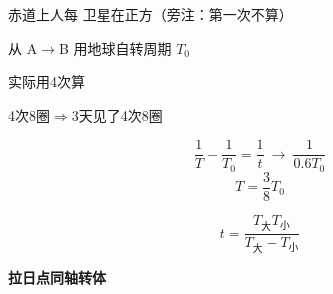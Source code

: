 \begin{problem}
赤道上人每\,\,卫星在正方（旁注：第一次不算）

从 A$\to$B 用\quad 地球自转周期 $T_0$
\begin{solution}
\quad 实际用4次算

4次\quad 8圈\quad $\Longrightarrow$\quad 3天见了4次\quad 8圈

\quad {}

\[ \dfrac{1}{T}-\dfrac{1}{T_0}=\dfrac{1}{t}\ \to\ \dfrac{1}{0.6T_0} \]
\[ T=\dfrac{3}{8}T_0 \]

\[ t=\dfrac{T_{\text{大}}T_{\text{小}}}{T_{\text{大}}-T_{\text{小}}} \]
\end{solution}
\end{problem}
\textbf{拉日点}\quad\textbf{同轴转体}

